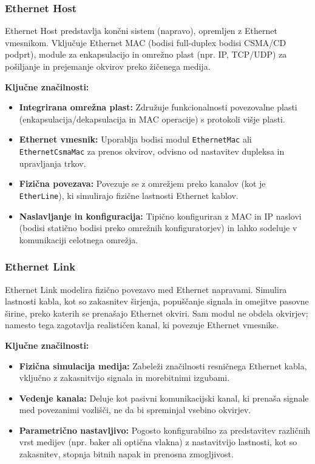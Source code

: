 \subsubsection{Ethernet Host}
Ethernet Host predstavlja končni sistem (napravo), opremljen z Ethernet vmesnikom. Vključuje Ethernet MAC (bodisi full-duplex bodisi CSMA/CD podprt), module za enkapsulacijo in omrežno plast (npr. IP, TCP/UDP) za pošiljanje in prejemanje okvirov preko žičenega medija.

\vspace{1em}

\noindent\begin{minipage}{\linewidth}
    \textbf{Ključne značilnosti:}
    \begin{itemize}
        \item \textbf{Integrirana omrežna plast:} Združuje funkcionalnosti povezovalne plasti (enkapsulacija/dekapsulacija in MAC operacije) s protokoli višje plasti.
        \item \textbf{Ethernet vmesnik:} Uporablja bodisi modul \texttt{EthernetMac} ali \texttt{EthernetCsmaMac} za prenos okvirov, odvisno od nastavitev dupleksa in upravljanja trkov.
        \item \textbf{Fizična povezava:} Povezuje se z omrežjem preko kanalov (kot je \texttt{EtherLine}), ki simulirajo fizične lastnosti Ethernet kablov.
        \item \textbf{Naslavljanje in konfiguracija:} Tipično konfiguriran z MAC in IP naslovi (bodisi statično bodisi preko omrežnih konfiguratorjev) in lahko sodeluje v komunikaciji celotnega omrežja.
    \end{itemize}
\end{minipage}

\subsubsection{Ethernet Link}
Ethernet Link modelira fizično povezavo med Ethernet napravami. Simulira lastnosti kabla, kot so zakasnitev širjenja, popuščanje signala in omejitve pasovne širine, preko katerih se prenašajo Ethernet okviri. Sam modul ne obdela okvirjev; namesto tega zagotavlja realističen kanal, ki povezuje Ethernet vmesnike.

\vspace{1em}

\noindent\begin{minipage}{\linewidth}
    \textbf{Ključne značilnosti:}
    \begin{itemize}
        \item \textbf{Fizična simulacija medija:} Zabeleži značilnosti resničnega Ethernet kabla, vključno z zakasnitvijo signala in morebitnimi izgubami.
        \item \textbf{Vedenje kanala:} Deluje kot pasivni komunikacijski kanal, ki prenaša signale med povezanimi vozlišči, ne da bi spreminjal vsebino okvirjev.
        \item \textbf{Parametrično nastavljivo:} Pogosto konfigurabilno za predstavitev različnih vrst medijev (npr. baker ali optična vlakna) z nastavitvijo lastnosti, kot so zakasnitev, stopnja bitnih napak in prenosna zmogljivost.
    \end{itemize}
\end{minipage}
